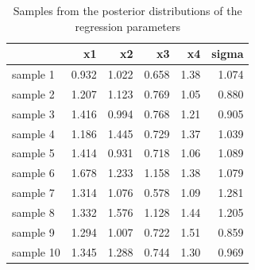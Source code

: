 \documentclass[11pt,a4paper,twoside]{book}\usepackage[]{graphicx}\usepackage[]{color}
\newenvironment{knitrout}{}{} %
\begin{document}
\begin{knitrout}
\color{fgcolor}\begin{table}

\caption{\label{tab:simdata.postsample2}Samples from the posterior distributions of the regression parameters}
\centering
\begin{tabular}[t]{lrrrrr}
\toprule
  & x1 & x2 & x3 & x4 & sigma\\
\midrule
sample 1 & 0.932 & 1.022 & 0.658 & 1.38 & 1.074\\
sample 2 & 1.207 & 1.123 & 0.769 & 1.05 & 0.880\\
sample 3 & 1.416 & 0.994 & 0.768 & 1.21 & 0.905\\
sample 4 & 1.186 & 1.445 & 0.729 & 1.37 & 1.039\\
sample 5 & 1.414 & 0.931 & 0.718 & 1.06 & 1.089\\
sample 6 & 1.678 & 1.233 & 1.158 & 1.38 & 1.079\\
sample 7 & 1.314 & 1.076 & 0.578 & 1.09 & 1.281\\
sample 8 & 1.332 & 1.576 & 1.128 & 1.44 & 1.205\\
sample 9 & 1.294 & 1.007 & 0.722 & 1.51 & 0.859\\
sample 10 & 1.345 & 1.288 & 0.744 & 1.30 & 0.969\\
\bottomrule
\end{tabular}
\end{table}


\end{knitrout}
\end{document}
